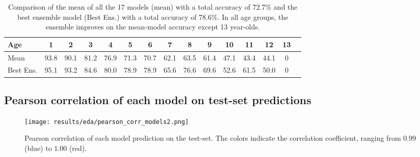\documentclass[10pt,letterpaper]{article}
\begin{document}
\centering
\begin{center}
\begin{table}[hbt!]
\caption{Comparison of the mean of all the 17 models (mean) with a total accuracy of 72.7\% and 
the best ensemble model (Best Ens.) with a total accuracy of 78.6\%. In all age groups, the
ensemble improves on the mean-model accuracy except 13 year-olds.}
\setlength\tabcolsep{3.5pt} %
\begin{tabular}{ |l|c|c|c|c|c|c|c|c|c|c|c|c|c|c| }
\hline
Age        & 1    & 2    & 3    & 4    & 5    & 6    & 7    &  8   & 9  & 10   & 11   & 12   & 13   \\ \hline
Mean       & 93.8 & 90.1 & 81.2 & 76.9 & 71.3 & 70.7 & 62.1 & 63.5 & 61.4 & 47.1 & 43.4 & 44.1 & 0 \\ 
Best Ens.  & 95.1 & 93.2 & 84.6 & 80.0 & 78.9 & 78.9 & 65.6 & 76.6 & 69.6 & 52.6 & 61.5 & 50.0 & 0 \\ \hline
\end{tabular}
\label{table9}
\end{table}
\end{center}

\pagebreak

\subsection*{Pearson correlation of each model on test-set predictions}
\centering

\begin{figure}[ht!]

  \centering
  \texttt{[image: results/eda/pearson\_corr\_models2.png]}
    \caption{Pearson correlation of each model prediction on the test-set. The colors indicate the correlation coefficient, ranging from 0.99 (blue) to 1.00 (red).}
  \label{marker9}    
\end{figure}

\pagebreak
\end{document}
